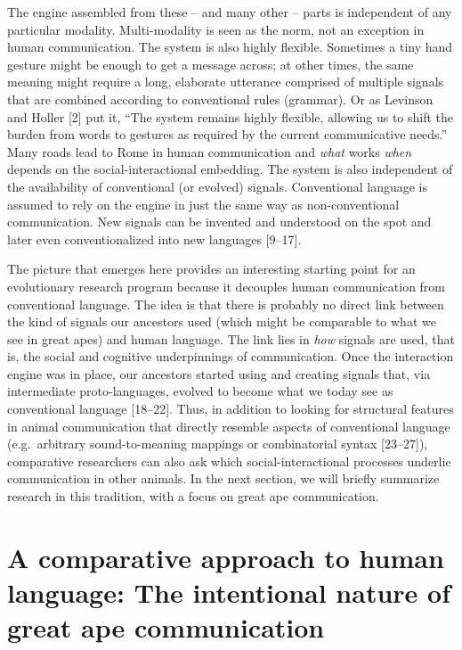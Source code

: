 \documentclass[
  man,floatsintext]{apa6}
\begin{document}
The engine assembled from these -- and many other -- parts is independent of any particular modality. Multi-modality is seen as the norm, not an exception in human communication. The system is also highly flexible. Sometimes a tiny hand gesture might be enough to get a message across; at other times, the same meaning might require a long, elaborate utterance comprised of multiple signals that are combined according to conventional rules (grammar). Or as Levinson and Holler {[}2{]} put it, ``The system remains highly flexible, allowing us to shift the burden from words to gestures as required by the current communicative needs.'' Many roads lead to Rome in human communication and \emph{what} works \emph{when} depends on the social-interactional embedding. The system is also independent of the availability of conventional (or evolved) signals. Conventional language is assumed to rely on the engine in just the same way as non-conventional communication. New signals can be invented and understood on the spot and later even conventionalized into new languages {[}9--17{]}.

The picture that emerges here provides an interesting starting point for an evolutionary research program because it decouples human communication from conventional language. The idea is that there is probably no direct link between the kind of signals our ancestors used (which might be comparable to what we see in great apes) and human language. The link lies in \emph{how} signals are used, that is, the social and cognitive underpinnings of communication. Once the interaction engine was in place, our ancestors started using and creating signals that, via intermediate proto-languages, evolved to become what we today see as conventional language {[}18--22{]}. Thus, in addition to looking for structural features in animal communication that directly resemble aspects of conventional language (e.g.~arbitrary sound-to-meaning mappings or combinatorial syntax {[}23--27{]}), comparative researchers can also ask which social-interactional processes underlie communication in other animals. In the next section, we will briefly summarize research in this tradition, with a focus on great ape communication.

\hypertarget{a-comparative-approach-to-human-language-the-intentional-nature-of-great-ape-communication}{%
\section{A comparative approach to human language: The intentional nature of great ape communication}\label{a-comparative-approach-to-human-language-the-intentional-nature-of-great-ape-communication}}
\end{document}
